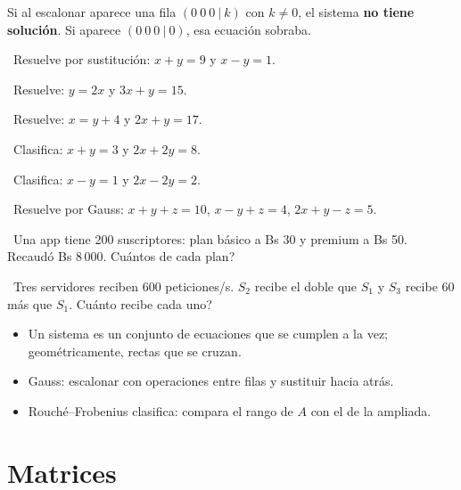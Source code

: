 \begin{tmcuidado}Si al escalonar aparece una fila $(0\ 0\ 0\ |\ k)$ con $k\neq0$, el sistema \textbf{no tiene soluci\'on}. Si aparece $(0\ 0\ 0\ |\ 0)$, esa ecuaci\'on sobraba.\end{tmcuidado}

\begin{tmejercicios}
\label{ej:3-2}
\begin{tmlista}
\item \tmbasico\ Resuelve por sustituci\'on: $x+y=9$ y $x-y=1$.
\item \tmbasico\ Resuelve: $y=2x$ y $3x+y=15$.
\item \tmbasico\ Resuelve: $x=y+4$ y $2x+y=17$.
\item \tmmedio\ Clasifica: $x+y=3$ y $2x+2y=8$.
\item \tmmedio\ Clasifica: $x-y=1$ y $2x-2y=2$.
\item \tmmedio\ Resuelve por Gauss: $x+y+z=10$, $x-y+z=4$, $2x+y-z=5$.
\item \tmdificil\ Una app tiene 200 suscriptores: plan b\'asico a Bs 30 y premium a Bs 50. Recaud\'o Bs 8\,000. \textquestiondown Cu\'antos de cada plan?
\item \tmdificil\ Tres servidores reciben 600 peticiones/s. $S_2$ recibe el doble que $S_1$ y $S_3$ recibe 60 m\'as que $S_1$. \textquestiondown Cu\'anto recibe cada uno?
\end{tmlista}
\end{tmejercicios}


\begin{tmresumen}
\begin{itemize}
\item Un sistema es un conjunto de ecuaciones que se cumplen a la vez; geom\'etricamente, rectas que se cruzan.
\item Gauss: escalonar con operaciones entre filas y sustituir hacia atr\'as.
\item Rouch\'e--Frobenius clasifica: compara el rango de $A$ con el de la ampliada.
\end{itemize}
\end{tmresumen}

\section{Matrices}
\label{sec:3-3}

